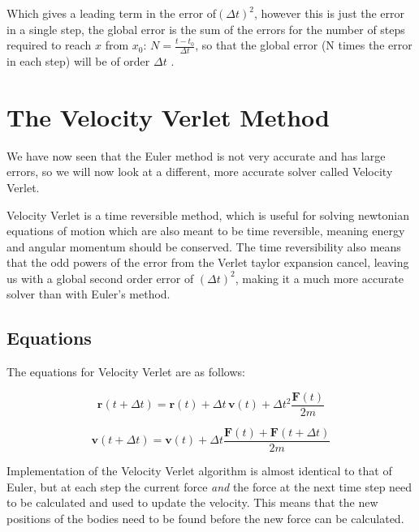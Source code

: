 \documentclass[11pt]{article}
\begin{document}
Which gives a leading term in the error of$ (\Delta t)^2$, however this is just the error in a single step, the global error is the sum of the errors for the number of steps required to reach $x$ from $x_0$: $N=\frac{t-t_0}{ \Delta t}$, so that the global error (N times the error in each step) will be of order $\Delta t$ \cite{Briefing}.

\centering
\section{The Velocity Verlet Method}
\raggedright




We have now seen that the Euler method is not very accurate and has large errors, so we will now look at a different, more accurate solver called Velocity Verlet.

Velocity Verlet is a time reversible method, which is useful for solving newtonian equations of motion which are also meant to be time reversible, meaning energy and angular momentum should be conserved. The time reversibility also means that the odd powers of the error from the Verlet taylor expansion cancel, leaving us with a global second order error of $(\Delta t)^2$, making it a much more accurate solver than with Euler's method.

\smallskip

\subsection{Equations}

The equations for Velocity Verlet are as follows:


$$\textbf{r}(t+\Delta t) = \textbf{r}(t) + \Delta t \, \textbf{v}(t) + \Delta t^2 \frac{\textbf{F}(t)}{2m}$$

$$\textbf{v}(t + \Delta t) = \textbf{v}(t) + \Delta t \frac{\textbf{F}(t) + \textbf{F}(t + \Delta t)}{2m}$$

\smallskip

Implementation of the Velocity Verlet algorithm is almost identical to that of Euler, but at each step the current force \textit{and} the force at the next time step need to be calculated and used to update the velocity. This means that the new positions of the bodies need to be found before the new force can be calculated.
\end{document}
